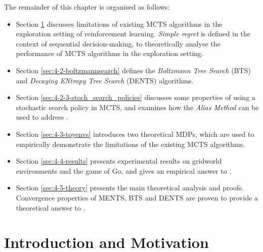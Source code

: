     The remainder of this chapter is organised as follows:
    \begin{itemize}
        \item Section \ref{sec:4-1-intro} discusses limitations of existing MCTS algorithms in the exploration setting of reinforcement learning. \textit{Simple regret} is defined in the context of sequential decision-making, to theoretically analyse the performance of MCTS algorithms in the exploration setting.
        \item Section \ref{sec:4-2-boltzmannsearch} defines the \textit{Boltzmann Tree Search} (BTS) and \textit{Decaying ENtropy Tree Search} (DENTS) algorithms.
        \item Section \ref{sec:4-2-3-stoch_search_policies} discusses some properties of using a stochastic search policy in MCTS, and examines how the \textit{Alias Method} can be used to address \complexityq.
        \item Section \ref{sec:4-3-toyenvs} introduces two theoretical MDPs, which are used to empirically demonstrate the limitations of the existing MCTS algorithms.
        \item Section \ref{sec:4-4-results} presents experimental results on gridworld environments and the game of Go, and gives an empirical answer to \entropyq.
        \item Section \ref{sec:4-5-theory} presents the main theoretical analysis and proofs. Convergence properties of MENTS, BTS and DENTS are proven to provide a theoretical answer to \entropyq.
    \end{itemize}






\section{Introduction and Motivation}
\label{sec:4-1-intro}

